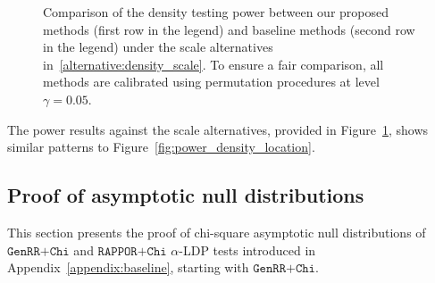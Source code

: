 \documentclass[twoside,11pt]{article}
\newcommand{\privacyParameter}{\alpha} %
\begin{document}
\begin{appendix}
\begin{figure}
		
		\caption{Comparison of the density testing power between our proposed methods (first row in the legend) and baseline methods (second row in the legend) under the scale alternatives in~\eqref{alternative:density_scale}. To ensure a fair comparison, all methods are calibrated using permutation procedures at level $\gamma = 0.05$.
		}
		\label{fig:power_density_scale}
	\end{figure}
	The power results against the scale  alternatives, provided in Figure~\ref{fig:power_density_scale}, shows similar patterns to Figure~\ref{fig:power_density_location}.
	
	\subsection{Proof of asymptotic null distributions}
	This section presents the proof of chi-square asymptotic null distributions of $\texttt{GenRR+Chi}$ and $\texttt{RAPPOR+Chi}$ $\privacyParameter$-LDP tests introduced in Appendix~\ref{appendix:baseline}, starting with $\texttt{GenRR+Chi}$.

\end{appendix}
\end{document}

